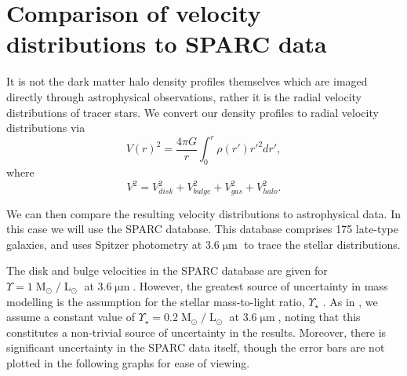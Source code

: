 \documentclass[a4paper,11pt]{article}
\begin{document}
\section{Comparison of velocity distributions to SPARC data}\label{sec:velocity}

It is not the dark matter halo density profiles themselves which are imaged directly through astrophysical observations, rather it is the radial velocity distributions of tracer stars. We convert our density profiles to radial velocity distributions \cite{Sofue:2008wt} via 
%
\begin{equation}
    V(r)^2 = \frac{4\pi G}{r}\int_0^r \rho(r')r'^2 dr',
\end{equation}
where 
\begin{equation}
    V^2 = V_{disk}^2 + V_{bulge}^2 + V_{gas}^2 + V_{halo}^2.
\end{equation}
%

We can then compare the resulting velocity distributions to astrophysical data. In this case we will use the SPARC database. This database comprises 175 late-type galaxies, and uses Spitzer photometry at $3.6\operatorname{\mu m}$ to trace the stellar distributions.

The disk and bulge velocities in the SPARC database are given for $\Upsilon = 1 \operatorname{M}_{\odot}/\operatorname{L}_{\odot}$ at $3.6\operatorname{\mu m}$. However, the greatest source of uncertainty in mass modelling is the assumption for the stellar mass-to-light ratio, $\Upsilon_\star$ \cite{Lelli:2016zqa}. As in \cite{Robles:2018fur}, we  assume a constant value of $\Upsilon_\star = 0.2 \operatorname{M}_{\odot}/\operatorname{L}_{\odot}$ at $3.6\operatorname{\mu m}$, noting that  this constitutes a non-trivial source of uncertainty in the results. Moreover, there is significant uncertainty in the SPARC data itself, though the error bars are not plotted in the following graphs for ease of viewing. 
\end{document}

